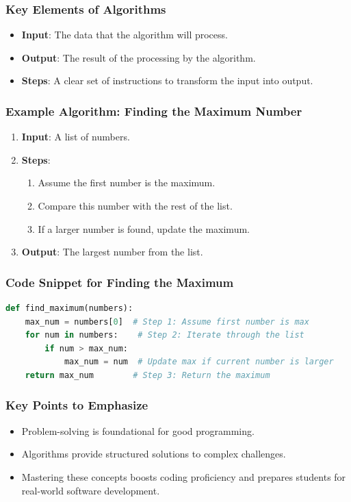 \documentclass{beamer}
\begin{document}
\begin{frame}[fragile]
    \frametitle{Key Elements of Algorithms}
    \begin{itemize}
        \item \textbf{Input}: The data that the algorithm will process.
        \item \textbf{Output}: The result of the processing by the algorithm.
        \item \textbf{Steps}: A clear set of instructions to transform the input into output.
    \end{itemize}
\end{frame}

\begin{frame}[fragile]
    \frametitle{Example Algorithm: Finding the Maximum Number}
    \begin{enumerate}
        \item \textbf{Input}: A list of numbers.
        \item \textbf{Steps}:
        \begin{enumerate}
            \item Assume the first number is the maximum.
            \item Compare this number with the rest of the list.
            \item If a larger number is found, update the maximum.
        \end{enumerate}
        \item \textbf{Output}: The largest number from the list.
    \end{enumerate}
\end{frame}

\begin{frame}[fragile]
    \frametitle{Code Snippet for Finding the Maximum}
    \begin{lstlisting}[language=Python]
def find_maximum(numbers):
    max_num = numbers[0]  # Step 1: Assume first number is max
    for num in numbers:    # Step 2: Iterate through the list
        if num > max_num:
            max_num = num  # Update max if current number is larger
    return max_num        # Step 3: Return the maximum
    \end{lstlisting}
\end{frame}

\begin{frame}[fragile]
    \frametitle{Key Points to Emphasize}
    \begin{itemize}
        \item Problem-solving is foundational for good programming.
        \item Algorithms provide structured solutions to complex challenges.
        \item Mastering these concepts boosts coding proficiency and prepares students for real-world software development.
    \end{itemize}
\end{frame}
\end{document}
